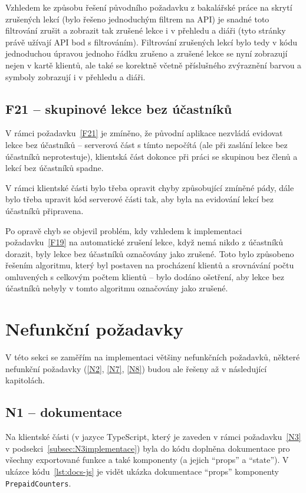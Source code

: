 Vzhledem ke způsobu řešení původního požadavku z bakalářské práce na skrytí zrušených lekcí (bylo řešeno jednoduchým filtrem na API) je snadné toto filtrování zrušit a zobrazit tak zrušené lekce i v přehledu a diáři (tyto stránky právě užívají API bod s filtrováním). Filtrování zrušených lekcí bylo tedy v kódu jednoduchou úpravou jednoho řádku zrušeno a zrušené lekce se nyní zobrazují nejen v kartě klientů, ale také se korektně včetně příslušného zvýraznění barvou a symboly zobrazují i v přehledu a diáři.

\subsection{F21 -- skupinové lekce bez účastníků}\label{subsec:F21implementace}

V rámci požadavku~\ref{F21} je zmíněno, že původní aplikace nezvládá evidovat lekce bez účastníků -- serverová část s tímto nepočítá (ale při zaslání lekce bez účastníků neprotestuje), klientská část dokonce při práci se skupinou bez členů a lekcí bez účastníků spadne.

V rámci klientské části bylo třeba opravit chyby způsobující zmíněné pády, dále bylo třeba upravit kód serverové části tak, aby byla na evidování lekcí bez účastníků připravena.

Po opravě chyb se objevil problém, kdy vzhledem k implementaci požadavku~\ref{F19} na automatické zrušení lekce, když nemá nikdo z účastníků dorazit, byly lekce bez účastníků označovány jako zrušené. Toto bylo způsobeno řešením algoritmu, který byl postaven na procházení klientů a srovnávání počtu omluvených s celkovým počtem klientů -- bylo dodáno ošetření, aby lekce bez účastníků nebyly v tomto algoritmu označovány jako zrušené.

\section{Nefunkční požadavky}

V této sekci se zaměřím na implementaci většiny nefunkčních požadavků, některé nefunkční požadavky (\ref{N2}, \ref{N7}, \ref{N8}) budou ale řešeny až v následující kapitolách.

\subsection{N1 -- dokumentace}

Na klientské části (v jazyce TypeScript, který je zaveden v rámci požadavku~\ref{N3} v podsekci~\ref{subsec:N3implementace}) byla do kódu doplněna dokumentace pro všechny exportované funkce a také komponenty (a jejich \enquote{props} a \enquote{state}). V ukázce kódu~\ref{lst:docs-js} je vidět ukázka dokumentace \enquote{props} komponenty \verb|PrepaidCounters|.

